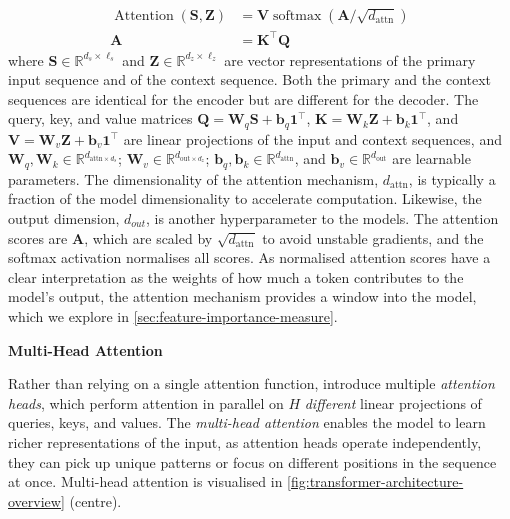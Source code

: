 \begin{equation}
    \begin{aligned}
        \operatorname{Attention}(\mathbf{S},\mathbf{Z}) & = \mathbf{V} \operatorname{softmax}\left(\mathbf{A} / \sqrt{d_{\mathrm{attn}}}\right) \\
        \mathbf{A}                                      & = \mathbf{K}^{\top} \mathbf{Q}
    \end{aligned}
    \label{eq:attention}
\end{equation}
where $\mathbf{S} \in \mathbb{R}^{d_s \times \ell_s}$ and $\mathbf{Z} \in \mathbb{R}^{d_z \times \ell_z}$ are vector representations of the primary input sequence and of the context sequence. Both the primary and the context sequences are identical for the encoder but are different for the decoder. The query, key, and value matrices $\mathbf{Q}=\mathbf{W}_q \mathbf{S} + \mathbf{b}_q\mathbf{1}^{\top}$, $\mathbf{K}=\mathbf{W}_k \mathbf{Z} + \mathbf{b}_k\mathbf{1}^{\top}$, and $\mathbf{V}=\mathbf{W}_v \mathbf{Z} + \mathbf{b}_v\mathbf{1}^{\top}$ are linear projections of the input and context sequences, and $\mathbf{W}_q, \mathbf{W}_k \in \mathbb{R}^{d_{\mathrm{attn}\times d_{s}}}$; $\mathbf{W}_v \in \mathbb{R}^{d_{\mathrm{out}\times d_{z}}}$; $\mathbf{b}_q, \mathbf{b}_k \in \mathbb{R}^{d_{\mathrm{attn}}}$, and $\mathbf{b}_v \in \mathbb{R}^{d_{\mathrm{out}}}$ are learnable parameters. The dimensionality of the attention mechanism, $d_{\mathrm{attn}}$, is typically a fraction of the model dimensionality to accelerate computation. Likewise, the output dimension, $d_{out}$, is another hyperparameter to the models. The attention scores are $\mathbf{A}$, which are scaled by $\sqrt{d_{\mathrm{attn}}}$ to avoid unstable gradients, and the softmax activation normalises all scores. As normalised attention scores have a clear interpretation as the weights of how much a token contributes to the model's output, the attention mechanism provides a window into the model, which we explore in \cref{sec:feature-importance-measure}.

\textbf{Multi-Head Attention}

Rather than relying on a single attention function, \textcite[][4--5]{vaswaniAttentionAllYou2017} introduce multiple \emph{attention heads}, which perform attention in parallel on $H$ \emph{different} linear projections of queries, keys, and values. The \emph{multi-head attention} enables the model to learn richer representations of the input, as attention heads operate independently, they can pick up unique patterns or focus on different positions in the sequence at once. Multi-head attention is visualised in \cref{fig:transformer-architecture-overview} (centre).

